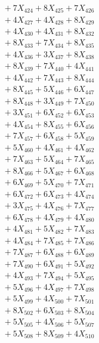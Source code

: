 \documentclass[a4paper,10pt]{article}
\begin{document}
{\begin{align}
&\;  + 7 X_{424} + 8 X_{425} + 7 X_{426} \\[0.3ex]
&\;  + 4 X_{427} + 4 X_{428} + 8 X_{429} \\[0.5ex]\allowbreak
&\;  + 4 X_{430} + 4 X_{431} + 8 X_{432} \\[0.3ex]
&\;  + 8 X_{433} + 7 X_{434} + 8 X_{435} \\[0.3ex]
&\;  + 4 X_{436} + 3 X_{437} + 8 X_{438} \\[0.3ex]
&\;  + 8 X_{439} + 7 X_{440} + 4 X_{441} \\[0.3ex]
&\;  + 4 X_{442} + 7 X_{443} + 8 X_{444} \\[0.3ex]
&\;  + 8 X_{445} + 5 X_{446} + 6 X_{447} \\[0.3ex]
&\;  + 8 X_{448} + 3 X_{449} + 7 X_{450} \\[0.3ex]
&\;  + 3 X_{451} + 6 X_{452} + 6 X_{453} \\[0.3ex]
&\;  + 4 X_{454} + 8 X_{455} + 6 X_{456} \\[0.3ex]
&\;  + 7 X_{457} + 6 X_{458} + 5 X_{459} \\[0.5ex]\allowbreak
&\;  + 5 X_{460} + 4 X_{461} + 4 X_{462} \\[0.3ex]
&\;  + 7 X_{463} + 5 X_{464} + 7 X_{465} \\[0.3ex]
&\;  + 8 X_{466} + 5 X_{467} + 6 X_{468} \\[0.3ex]
&\;  + 6 X_{469} + 5 X_{470} + 7 X_{471} \\[0.3ex]
&\;  + 6 X_{472} + 6 X_{473} + 4 X_{474} \\[0.3ex]
&\;  + 3 X_{475} + 4 X_{476} + 7 X_{477} \\[0.3ex]
&\;  + 6 X_{478} + 4 X_{479} + 4 X_{480} \\[0.3ex]
&\;  + 4 X_{481} + 5 X_{482} + 7 X_{483} \\[0.3ex]
&\;  + 4 X_{484} + 7 X_{485} + 7 X_{486} \\[0.3ex]
&\;  + 7 X_{487} + 6 X_{488} + 6 X_{489} \\[0.5ex]\allowbreak
&\;  + 7 X_{490} + 6 X_{491} + 5 X_{492} \\[0.3ex]
&\;  + 4 X_{493} + 7 X_{494} + 5 X_{495} \\[0.3ex]
&\;  + 5 X_{496} + 4 X_{497} + 7 X_{498} \\[0.3ex]
&\;  + 5 X_{499} + 4 X_{500} + 7 X_{501} \\[0.3ex]
&\;  + 8 X_{502} + 6 X_{503} + 8 X_{504} \\[0.3ex]
&\;  + 5 X_{505} + 4 X_{506} + 5 X_{507} \\[0.3ex]
&\;  + 5 X_{508} + 8 X_{509} + 4 X_{510} \\[0.3ex]

\end{align}}
\end{document}

